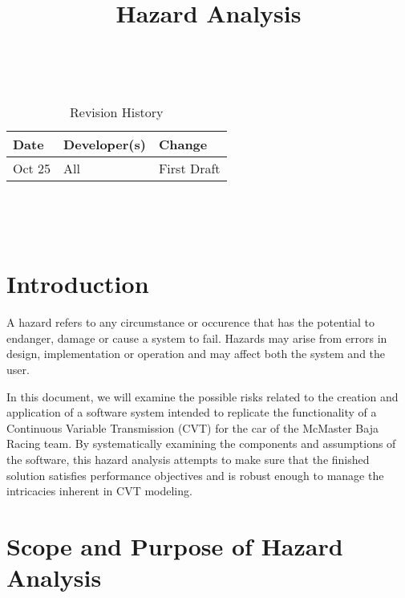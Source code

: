 \documentclass{article}
\title{Hazard Analysis\\\progname}
\author{\authname}
\date{}
\begin{document}
\maketitle
\thispagestyle{empty}

~\newpage


\begin{table}[hp]
\caption{Revision History} \label{TblRevisionHistory}
\begin{tabularx}{\textwidth}{llX}
\toprule
\textbf{Date} & \textbf{Developer(s)} & \textbf{Change}\\
\midrule
Oct 25 & All & First Draft\\
\bottomrule
\end{tabularx}
\end{table}

~\newpage

\tableofcontents

~\newpage


\section{Introduction}

A hazard refers to any circumstance or occurence that has the potential to endanger, damage or cause a system to fail. Hazards may arise from errors in design, implementation or operation and may affect both the system and the user.

\noindent In this document, we will examine the possible risks related to the creation and application of a software system intended to replicate the functionality of a Continuous Variable Transmission (CVT) for the car of the McMaster Baja Racing team. By systematically examining the components and assumptions of the software, this hazard analysis attempts to make sure that the finished solution satisfies performance objectives and is robust enough to manage the intricacies inherent in CVT modeling.

\section{Scope and Purpose of Hazard Analysis}
\end{document}
